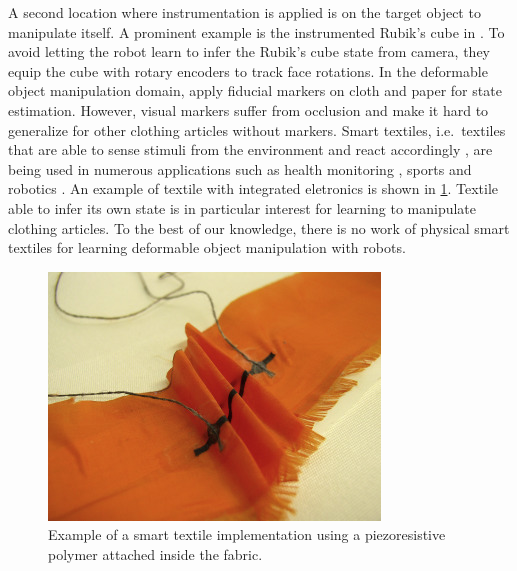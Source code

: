 \documentclass[\home/main.tex]{subfiles}
\begin{document}
A second location where instrumentation is applied is on the target object to manipulate itself. A prominent example is the instrumented Rubik's cube in \autocite{openai2019solving}. To avoid letting the robot learn to infer the Rubik's cube state from camera, they equip the cube with rotary encoders to track face rotations. In the deformable object manipulation domain, \Textcite{Bersch2011, Elbrechter2012} apply fiducial markers on cloth and paper for state estimation. However, visual markers suffer from occlusion and make it hard to generalize for other clothing articles without markers. Smart textiles, i.e.\ textiles that are able to sense stimuli from the environment and react accordingly \autocite{schnee17}, are being used in numerous applications such as health monitoring \autocite{Cochrane2019}, sports \autocite{Presti2019} and robotics \autocite{Yuen2017}. An example of textile with integrated eletronics is shown in \cref{fig:smart_textile_example}. Textile able to infer its own state is in particular interest for learning to manipulate clothing articles. To the best of our knowledge, there is no work of physical smart textiles for learning deformable object manipulation with robots. 

\begin{figure}[htbp]
	\centering
	\includegraphics[width=\textwidth]{figures/smart-textile-polymer}	
	\caption[Example of a smart textile implementation.]{Example of a smart textile implementation using a piezoresistive polymer attached inside the fabric.}
	\label{fig:smart_textile_example}
\end{figure}
\end{document}
